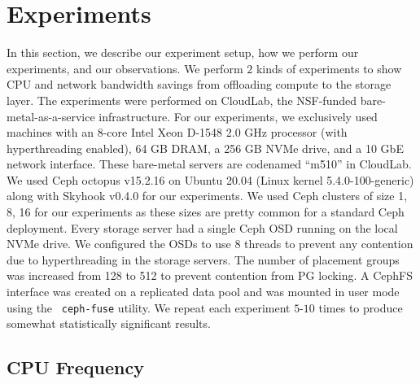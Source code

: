 \documentclass[12pt]{article}
\newcommand{\code}[1]{\colorbox{light-gray}{\texttt{#1}}}
\begin{document}
\section{Experiments}
\label{sec:experiments}
In this section, we describe our experiment setup, how we perform our experiments, and our observations. We perform $2$ kinds of experiments to show CPU and network bandwidth savings from offloading compute to the storage layer. The experiments were performed on CloudLab, the NSF-funded bare-metal-as-a-service infrastructure. For our
experiments, we exclusively used machines with an 8-core
Intel Xeon D-1548 2.0 GHz processor (with hyperthreading
enabled), 64 GB DRAM, a 256 GB NVMe drive, and a 10 GbE
network interface. These bare-metal servers are codenamed
“m510” in CloudLab. We used Ceph octopus v15.2.16 on Ubuntu 20.04 (Linux kernel 5.4.0-100-generic) along with Skyhook v0.4.0 for our experiments. We used Ceph clusters of size 1, 8, 16 for our experiments as these sizes are pretty common for a standard Ceph deployment. Every storage server had a single Ceph OSD running on the local NVMe drive. We configured the OSDs to use 8 threads to prevent any contention due to hyperthreading in the storage servers. The number of placement groups was increased from 128 to 512 to prevent contention from PG locking. A CephFS interface was created on a replicated data pool and was mounted in user mode using the ~\code{ceph-fuse} utility. We repeat each experiment $5$-$10$ times to produce somewhat statistically significant results. 
\subsection{CPU Frequency}
\end{document}
